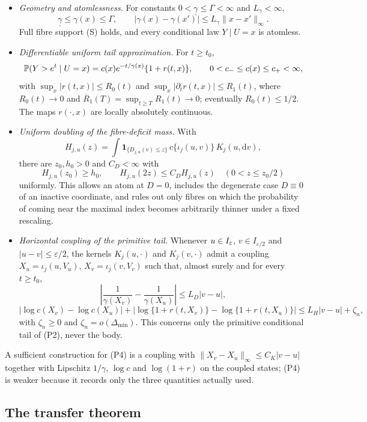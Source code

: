 \documentclass[bj,authoryear]{imsart}
\theoremstyle{plain}
\begin{document}
\begin{appendix}
\begin{itemize}
\item[(P1)] \emph{Geometry and atomlessness.} For constants
 $0<\underline\gamma\le\Gamma<\infty$ and $L_\gamma<\infty$,
 \[
  \underline\gamma\le\gamma(x)\le\Gamma,
  \qquad
  |\gamma(x)-\gamma(x')|\le L_\gamma\|x-x'\|_\infty .
 \]
 Full fibre support (S) holds, and every conditional law $Y\mid U=x$ is
 atomless.
\item[(P2)] \emph{Differentiable uniform tail approximation.} For
 $t\ge t_0$,
 \[
  \mathbb P(Y>e^t\mid U=x)=c(x)e^{-t/\gamma(x)}\{1+r(t,x)\},
  \qquad 0<c_-\le c(x)\le c_+<\infty,
 \]
 with $\sup_x|r(t,x)|\le R_0(t)$ and
 $\sup_x|\partial_tr(t,x)|\le R_1(t)$, where $R_0(t)\to0$ and
 $\overline R_1(T)=\sup_{t\ge T}R_1(t)\to0$; eventually
 $R_0(t)\le1/2$. The maps $r(\cdot,x)$ are locally absolutely
 continuous.
\item[(P3)] \emph{Uniform doubling of the fibre-deficit mass.} With
 \[
  H_{j,u}(z)=\int\mathbf 1_{\{D_{j,u}(v)\le z\}}\,
  c\{\iota_j(u,v)\}\,K_j(u,\mathrm dv),
 \]
 there are $z_0,h_0>0$ and $C_D<\infty$ with
 \[
  H_{j,u}(z_0)\ge h_0,
  \qquad
  H_{j,u}(2z)\le C_DH_{j,u}(z)
  \quad(0<z\le z_0/2)
 \]
 uniformly. This allows an atom at $D=0$, includes the degenerate case
 $D\equiv0$ of an inactive coordinate, and rules out only fibres on
 which the probability of coming near the maximal index becomes
 arbitrarily thinner under a fixed rescaling.
\item[(P4)] \emph{Horizontal coupling of the primitive tail.} Whenever
 $u\in I_\varepsilon$, $v\in I_{\varepsilon/2}$ and $|u-v|\le\varepsilon/2$, the
 kernels $K_j(u,\cdot)$ and $K_j(v,\cdot)$ admit a coupling
 $X_u=\iota_j(u,V_u)$, $X_v=\iota_j(v,V_v)$ such that, almost surely and
 for every $t\ge t_0$,
 \[
  \left|\frac1{\gamma(X_v)}-\frac1{\gamma(X_u)}\right|\le L_D|v-u|,
 \]
 \[
  |\log c(X_v)-\log c(X_u)|
  +|\log\{1+r(t,X_v)\}-\log\{1+r(t,X_u)\}|
  \le L_H|v-u|+\zeta_n,
 \]
 with $\zeta_n\ge0$ and $\zeta_n=o(\Delta_{\min})$. This concerns only
 the primitive conditional tail of (P2), never the body.
\end{itemize}

A sufficient construction for (P4) is a coupling with
$\|X_v-X_u\|_\infty\le C_K|v-u|$ together with Lipschitz $1/\gamma$,
$\log c$ and $\log(1+r)$ on the coupled states; (P4) is weaker because it
records only the three quantities actually used.

\subsection{The transfer theorem}


\end{appendix}
\end{document}
